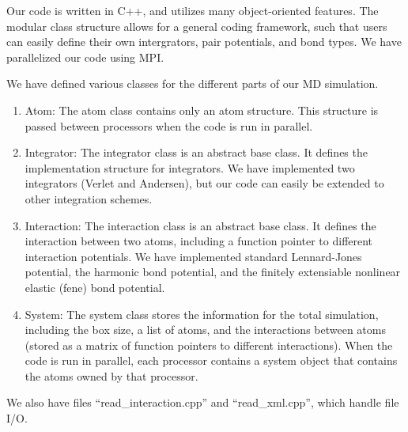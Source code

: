 \documentclass[10pt]{article}
\begin{document}
Our code is written in C++, and utilizes many object-oriented features. 
%
The modular class structure allows for a general coding framework, such that users can easily define their own intergrators, pair potentials, and bond types. 
%
We have parallelized our code using MPI. 
%

We have defined various classes for the different parts of our MD simulation. 
%
\begin{enumerate}
\item Atom: The atom class contains only an atom structure. This structure is passed between processors when the code is run in parallel.
\item Integrator: The integrator class is an abstract base class. It defines the implementation structure for integrators. We have implemented two integrators (Verlet and Andersen), but our code can easily be extended to other integration schemes. 
\item Interaction: The interaction class is an abstract base class. It defines the interaction between two atoms, including a function pointer to different interaction potentials. We have implemented standard Lennard-Jones potential, the harmonic bond potential, and the finitely extensiable nonlinear elastic (fene) bond potential. 
\item System: The system class stores the information for the total simulation, including the box size, a list of atoms, and the interactions between atoms (stored as a matrix of function pointers to different interactions). When the code is run in parallel, each processor contains a system object that contains the atoms owned by that processor.
\end{enumerate}

We also have files ``read\_interaction.cpp'' and ``read\_xml.cpp'', which handle file I/O. 
%
\end{document}
